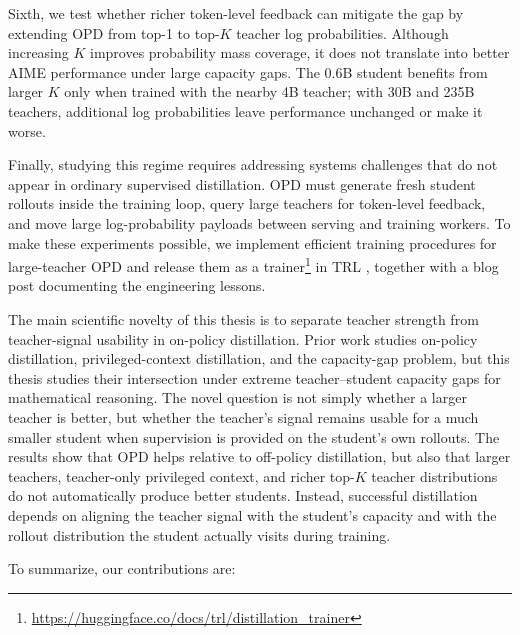 Sixth, we test whether richer token-level feedback can mitigate the gap by extending OPD from top-1 to top-$K$ teacher log probabilities. Although increasing $K$ improves probability mass coverage, it does not translate into better AIME performance under large capacity gaps. The 0.6B student benefits from larger $K$ only when trained with the nearby 4B teacher; with 30B and 235B teachers, additional log probabilities leave performance unchanged or make it worse.

Finally, studying this regime requires addressing systems challenges that do not appear in ordinary supervised distillation. OPD must generate fresh student rollouts inside the training loop, query large teachers for token-level feedback, and move large log-probability payloads between serving and training workers. To make these experiments possible, we implement efficient training procedures for large-teacher OPD and release them as a trainer\footnote{\url{https://huggingface.co/docs/trl/distillation_trainer}} in TRL \cite{vonwerra2020trl}, together with a blog post \cite{patino2026_distilling_100b_models_40x_faster_with_trl} documenting the engineering lessons.

The main scientific novelty of this thesis is to separate teacher strength from teacher-signal usability in on-policy distillation. Prior work studies on-policy distillation, privileged-context distillation, and the capacity-gap problem, but this thesis studies their intersection under extreme teacher--student capacity gaps for mathematical reasoning. The novel question is not simply whether a larger teacher is better, but whether the teacher's signal remains usable for a much smaller student when supervision is provided on the student's own rollouts. The results show that OPD helps relative to off-policy distillation, but also that larger teachers, teacher-only privileged context, and richer top-$K$ teacher distributions do not automatically produce better students. Instead, successful distillation depends on aligning the teacher signal with the student's capacity and with the rollout distribution the student actually visits during training.

To summarize, our contributions are:

